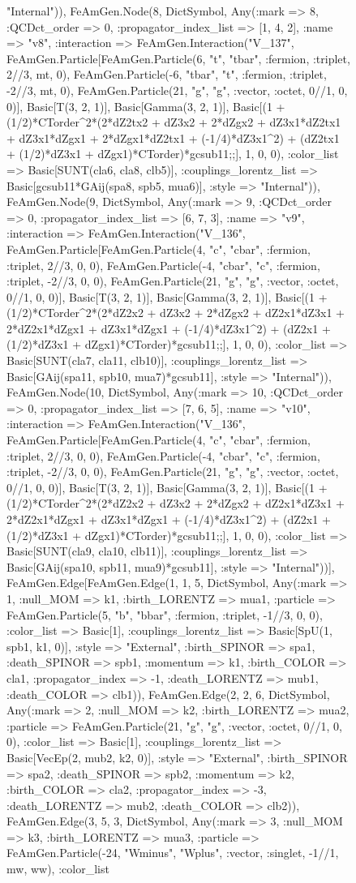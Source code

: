 \documentclass{revtex4}
\begin{document}
\begin{figure}[!htb]
\begin{center}
{"Internal")), FeAmGen.Node(8, Dict{Symbol, Any}(:mark => 8, :QCDct_order => 0, :propagator_index_list => [1, 4, 2], :name => "v8", :interaction => FeAmGen.Interaction("V_137", FeAmGen.Particle[FeAmGen.Particle(6, "t", "tbar", :fermion, :triplet, 2//3, mt, 0), FeAmGen.Particle(-6, "tbar", "t", :fermion, :triplet, -2//3, mt, 0), FeAmGen.Particle(21, "g", "g", :vector, :octet, 0//1, 0, 0)], Basic[T(3, 2, 1)], Basic[Gamma(3, 2, 1)], Basic[(1 + (1/2)*CTorder^2*(2*dZ2tx2 + dZ3x2 + 2*dZgx2 + dZ3x1*dZ2tx1 + dZ3x1*dZgx1 + 2*dZgx1*dZ2tx1 + (-1/4)*dZ3x1^2) + (dZ2tx1 + (1/2)*dZ3x1 + dZgx1)*CTorder)*gcsub11;;], 1, 0, 0), :color_list => Basic[SUNT(cla6, cla8, clb5)], :couplings_lorentz_list => Basic[gcsub11*GAij(spa8, spb5, mua6)], :style => "Internal")), FeAmGen.Node(9, Dict{Symbol, Any}(:mark => 9, :QCDct_order => 0, :propagator_index_list => [6, 7, 3], :name => "v9", :interaction => FeAmGen.Interaction("V_136", FeAmGen.Particle[FeAmGen.Particle(4, "c", "cbar", :fermion, :triplet, 2//3, 0, 0), FeAmGen.Particle(-4, "cbar", "c", :fermion, :triplet, -2//3, 0, 0), FeAmGen.Particle(21, "g", "g", :vector, :octet, 0//1, 0, 0)], Basic[T(3, 2, 1)], Basic[Gamma(3, 2, 1)], Basic[(1 + (1/2)*CTorder^2*(2*dZ2x2 + dZ3x2 + 2*dZgx2 + dZ2x1*dZ3x1 + 2*dZ2x1*dZgx1 + dZ3x1*dZgx1 + (-1/4)*dZ3x1^2) + (dZ2x1 + (1/2)*dZ3x1 + dZgx1)*CTorder)*gcsub11;;], 1, 0, 0), :color_list => Basic[SUNT(cla7, cla11, clb10)], :couplings_lorentz_list => Basic[GAij(spa11, spb10, mua7)*gcsub11], :style => "Internal")), FeAmGen.Node(10, Dict{Symbol, Any}(:mark => 10, :QCDct_order => 0, :propagator_index_list => [7, 6, 5], :name => "v10", :interaction => FeAmGen.Interaction("V_136", FeAmGen.Particle[FeAmGen.Particle(4, "c", "cbar", :fermion, :triplet, 2//3, 0, 0), FeAmGen.Particle(-4, "cbar", "c", :fermion, :triplet, -2//3, 0, 0), FeAmGen.Particle(21, "g", "g", :vector, :octet, 0//1, 0, 0)], Basic[T(3, 2, 1)], Basic[Gamma(3, 2, 1)], Basic[(1 + (1/2)*CTorder^2*(2*dZ2x2 + dZ3x2 + 2*dZgx2 + dZ2x1*dZ3x1 + 2*dZ2x1*dZgx1 + dZ3x1*dZgx1 + (-1/4)*dZ3x1^2) + (dZ2x1 + (1/2)*dZ3x1 + dZgx1)*CTorder)*gcsub11;;], 1, 0, 0), :color_list => Basic[SUNT(cla9, cla10, clb11)], :couplings_lorentz_list => Basic[GAij(spa10, spb11, mua9)*gcsub11], :style => "Internal"))], FeAmGen.Edge[FeAmGen.Edge(1, 1, 5, Dict{Symbol, Any}(:mark => 1, :null_MOM => k1, :birth_LORENTZ => mua1, :particle => FeAmGen.Particle(5, "b", "bbar", :fermion, :triplet, -1//3, 0, 0), :color_list => Basic[1], :couplings_lorentz_list => Basic[SpU(1, spb1, k1, 0)], :style => "External", :birth_SPINOR => spa1, :death_SPINOR => spb1, :momentum => k1, :birth_COLOR => cla1, :propagator_index => -1, :death_LORENTZ => mub1, :death_COLOR => clb1)), FeAmGen.Edge(2, 2, 6, Dict{Symbol, Any}(:mark => 2, :null_MOM => k2, :birth_LORENTZ => mua2, :particle => FeAmGen.Particle(21, "g", "g", :vector, :octet, 0//1, 0, 0), :color_list => Basic[1], :couplings_lorentz_list => Basic[VecEp(2, mub2, k2, 0)], :style => "External", :birth_SPINOR => spa2, :death_SPINOR => spb2, :momentum => k2, :birth_COLOR => cla2, :propagator_index => -3, :death_LORENTZ => mub2, :death_COLOR => clb2)), FeAmGen.Edge(3, 5, 3, Dict{Symbol, Any}(:mark => 3, :null_MOM => k3, :birth_LORENTZ => mua3, :particle => FeAmGen.Particle(-24, "Wminus", "Wplus", :vector, :singlet, -1//1, mw, ww), :color_list }
\end{center}
\end{figure}
\end{document}
